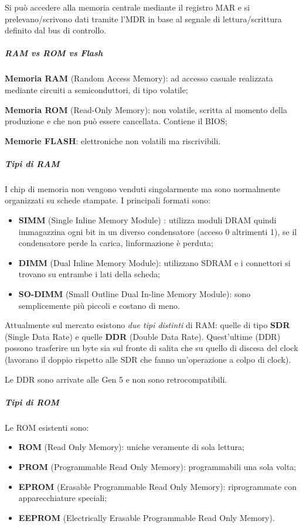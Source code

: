 Si può accedere alla memoria centrale mediante il registro MAR e si
prelevano/scrivono dati tramite l'MDR in base al segnale di
lettura/scrittura definito dal bus di controllo.

\subparagraph{\texorpdfstring{\emph{RAM vs ROM vs
Flash}}{RAM vs ROM vs Flash}}\label{ram-vs-rom-vs-flash}

\textbf{Memoria RAM} (Random Access Memory): ad accesso casuale
realizzata mediante circuiti a semiconduttori, di tipo volatile;

\textbf{Memoria ROM} (Read-Only Memory): non volatile, scritta al
momento della produzione e che non può essere cancellata. Contiene il
BIOS;

\textbf{Memorie FLASH}: elettroniche non volatili ma riscrivibili.

\subparagraph{\texorpdfstring{\emph{Tipi di RAM}
}{Tipi di RAM }}\label{tipi-di-ram}

I chip di memoria non vengono venduti singolarmente ma sono normalmente
organizzati su schede stampate. I principali formati sono:

\begin{itemize}
\item
  \textbf{SIMM} (Single Inline Memory Module) : utilizza moduli DRAM
  quindi immagazzina ogni bit in un diverso condensatore (acceso 0
  altrimenti 1), se il condensatore perde la carica,
  l\textquotesingle informazione è perduta;
\item
  \textbf{DIMM} (Dual Inline Memory Module): utilizzano SDRAM e i
  connettori si trovano su entrambe i lati della scheda;
\item
  \textbf{SO-DIMM} (Small Outline Dual In-line Memory Module): sono
  semplicemente più piccoli e costano di meno.
\end{itemize}

Attualmente sul mercato esistono \emph{due tipi distinti} di RAM: quelle
di tipo \textbf{SDR} (Single Data Rate) e quelle \textbf{DDR} (Double
Data Rate). Quest'ultime (DDR) possono trasferire un byte sia sul fronte
di salita che su quello di discesa del clock (lavorano il doppio
rispetto alle SDR che fanno un'operazione a colpo di clock).

Le DDR sono arrivate alle Gen 5 e non sono retrocompatibili.

\subparagraph{\texorpdfstring{\emph{Tipi di
ROM}}{Tipi di ROM}}\label{tipi-di-rom}

Le ROM esistenti sono:

\begin{itemize}
\item
  \textbf{ROM} (Read Only Memory): uniche veramente di sola lettura;
\item
  \textbf{PROM} (Programmable Read Only Memory): programmabili una sola
  volta;
\item
  \textbf{EPROM} (Erasable Programmable Read Only Memory): riprogrammate
  con apparecchiature speciali;
\item
  \textbf{EEPROM} (Electrically Erasable Programmable Read Only Memory).
\end{itemize}

